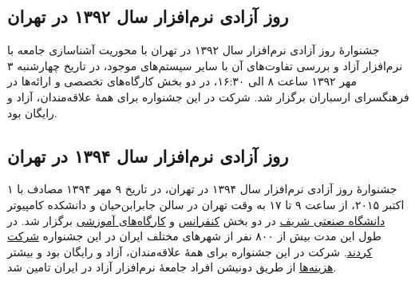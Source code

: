 \documentclass{article}
\begin{document}
\subsection{روز آزادی نرم‌افزار سال ۱۳۹۲ در تهران}
جشنوارهٔ روز آزادی نرم‌افزار سال ۱۳۹۲ در تهران با محوریت آشناسازی جامعه با نرم‌افزار آزاد و بررسی تفاوت‌های آن با سایر سیستم‌های موجود، در تاریخ چهارشنبه ۳ مهر ۱۳۹۲ ساعت ۸ الی ۱۶:۳۰، در دو بخش کارگاه‌های تخصصی و ارائه‌ها در فرهنگسرای ارسباران برگزار شد. شرکت در این جشنواره برای همهٔ علاقه‌مندان، آزاد و رایگان بود.

\subsection{روز آزادی نرم‌افزار سال ۱۳۹۴ در تهران}
جشنوارهٔ روز آزادی نرم‌افزار سال ۱۳۹۴ در تهران، در تاریخ ۹ مهر ۱۳۹۴ مصادف با ۱ اکتبر ۲۰۱۵، از ساعت ۹ تا ۱۷ به وقت تهران در سالن جابرابن‌حیان و دانشکده کامپیوتر \hspace{25pt} \href{http://sfd.fsug.ir/1394/directions}{دانشگاه صنعتی شریف} در دو بخش \href{http://sfd.fsug.ir/1394/plan/presentations}{کنفرانس} و \href{http://sfd.fsug.ir/1394/plan/workshops}{کارگاه‌های آموزشی} برگزار شد.  در طول این مدت بیش از ۸۰۰ نفر از شهرهای مختلف ایران در این جشنواره \href{http://sfd.fsug.ir/1394/about-us/participation}{شرکت کردند}. شرکت در این جشنواره برای همهٔ علاقه‌مندان، آزاد و رایگان بود و بیشتر \href{http://sfd.fsug.ir/1394/patronage/donation}{هزینه‌ها} از طریق دونیشن افراد جامعهٔ نرم‌افزار آزاد در ایران تامین شد.
\end{document}
